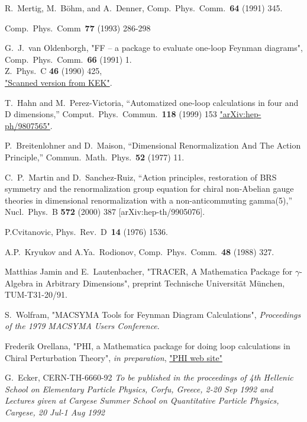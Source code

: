 \begin{thebibliography}{99}
 R.~Mertig, M.~B\"ohm, and A.~Denner,
Comp.~Phys.~Comm.~{\bf 64} (1991) 345. 

Comp.~Phys.~Comm~{\bf 77} (1993) 286-298

G.~J.~van Oldenborgh, "FF -- a package to evaluate one-loop Feynman diagrams",
Comp.~Phys.~Comm.~{\bf 66} (1991) 1.\\
Z.\ Phys.\ C {\bf 46} (1990) 425,\\
\href{http://ccdb3fs.kek.jp/cgi-bin/img_index?9004168}{"Scanned version from KEK"}.

T.~Hahn and M.~Perez-Victoria,
``Automatized one-loop calculations in four and D dimensions,''
Comput.\ Phys.\ Commun.\  {\bf 118} (1999) 153
\href{http://xxx.lanl.gov/abs/hep-ph/9807565}{"arXiv:hep-ph/9807565"}.

P.~Breitenlohner and D.~Maison,
``Dimensional Renormalization And The Action Principle,''
Commun.\ Math.\ Phys.\  {\bf 52} (1977) 11.

C.~P.~Martin and D.~Sanchez-Ruiz,
``Action principles, restoration of BRS symmetry and the renormalization  group equation for chiral non-Abelian gauge theories in dimensional
renormalization with a non-anticommuting gamma(5),''
Nucl.\ Phys.\ B {\bf 572} (2000) 387
[arXiv:hep-th/9905076].

P.Cvitanovic, Phys.~Rev.~D~{\bf 14} (1976) 1536.

A.P.~Kryukov and A.Ya.~Rodionov, Comp.~Phys.~Comm.~{\bf 48} (1988) 
327.

Matthias Jamin and E.~Lautenbacher, 
"TRACER, A Mathematica Package for $\gamma$-Algebra in Arbitrary Dimensions",
preprint Technische Universit\"at M\"unchen, TUM-T31-20/91.

 S.~Wolfram, "MACSYMA Tools for Feynman Diagram Calculations",
{\sl Proceedings of the 1979 MACSYMA Users Conference}.

 Frederik Orellana, "PHI, a Mathematica package for doing loop calculations in Chiral Perturbation Theory", {\it in preparation}, \href{http://www.feyncalc.org/phi/}{"PHI web site"}

G.~Ecker,
CERN-TH-6660-92
{\it To be published in the proceedings of 4th Hellenic School on Elementary Particle Physics, Corfu, Greece, 2-20 Sep 1992 and Lectures given at
Cargese Summer School on Quantitative Particle Physics, Cargese, 20 Jul-1 Aug 1992}


\end{thebibliography}
